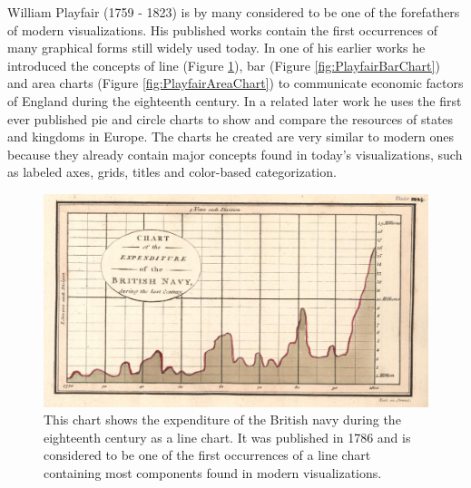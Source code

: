 William Playfair (1759 - 1823) is by many considered to be one of the forefathers of modern visualizations.
His published works contain the first occurrences of many graphical forms still widely used today.
In one of his earlier works \parencite{CommercialAndPoliticalAtlas} he introduced the concepts of line (Figure \ref{fig:PlayfairLineChart}), bar (Figure \ref{fig:PlayfairBarChart}) and area charts (Figure \ref{fig:PlayfairAreaChart}) to communicate economic factors of England during the eighteenth century.
In a related later work \parencite{StatisticalBreviary} he uses the first ever published pie and circle charts to show and compare the resources of states and kingdoms in Europe.
The charts he created are very similar to modern ones because they already contain major concepts found in today's visualizations, such as labeled axes, grids, titles and color-based categorization.

\begin{figure}[tp]
\centering
\includegraphics[keepaspectratio,width=\linewidth,height=\fullh / 3]{images/playfair-line-chart.png}
\caption[Line Chart by William Playfair From 1786]{
  This chart shows the expenditure of the British navy during the eighteenth century as a line chart.
  It was published in 1786 and is considered to be one of the first occurrences of a line chart containing most components found in modern visualizations.
}
\label{fig:PlayfairLineChart}
\end{figure}

